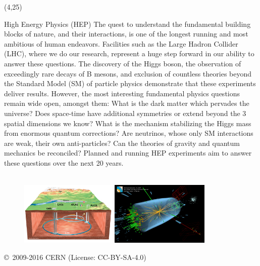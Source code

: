 \documentclass[final]{beamer}
\begin{document}
\begin{frame}{}
\begin{textblock}{38.0}(4,25)
\begin{block}{High Energy Physics (HEP)}
The quest to understand the fundamental building blocks of nature,
and their interactions, is one of the longest running and most
ambitious of human endeavors. Facilities such as the Large Hadron
Collider (LHC), where we do our research, represent a huge step
forward in our ability to answer these questions. The discovery of
the Higgs boson, the observation of exceedingly rare decays of B
mesons, and exclusion of countless theories beyond the Standard
Model (SM) of particle physics demonstrate that these experiments
deliver results. However, the most interesting fundamental physics
questions remain wide open, amongst them: What is the dark matter
which pervades the universe? Does space-time have additional
symmetries or extend beyond the 3 spatial dimensions we know? What
is the mechanism stabilizing the Higgs mass from enormous quantum
corrections? Are neutrinos, whose only SM interactions are weak,
their own anti-particles? Can the theories of gravity and quantum
mechanics be reconciled? Planned and running HEP experiments 
aim to answer these questions over the next 20 years.
~~~ \\
~~~ \\
\begin{figure}[tbph]
\centering
\includegraphics[width=0.41\textwidth]{images/CERN-LHC-cutaway-view-medium.png}
\includegraphics[width=0.42\textwidth]{images/eemm_run195099_evt137440354_ispy_3d-annotated-2.png}
\end{figure}
{\small \copyright~2009-2016 CERN (License: CC-BY-SA-4.0)}
\end{block}
\end{textblock}


\end{frame}
\end{document}
